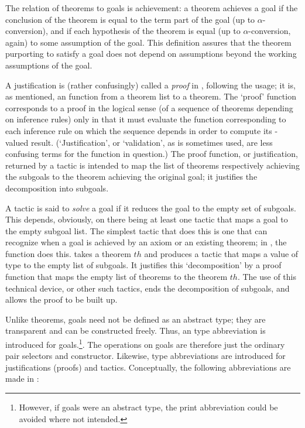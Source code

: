 The relation of theorems to goals is achievement:
a theorem achieves a goal if the conclusion of the theorem
is equal to the term part of the goal (up to $\alpha$-conversion), and
if each hypothesis of the theorem is equal (up to $\alpha$-conversion,
again) to some assumption of the goal. This definition assures that
the theorem purporting to satisfy a goal does not depend on
assumptions beyond the working assumptions of the goal.

A justification is (rather confusingly) called
a {\it proof\/}
in \HOL{}, following the \LCF{} usage; it is, as mentioned,
an \ML{} function
from a theorem list to a theorem.  The \ML{} `proof' function
corresponds to a proof
 in the
logical sense (of a sequence of theorems depending on inference rules)
only in that it must
evaluate the \ML{} function corresponding
to each inference rule on which the sequence depends
in order to compute its -valued result. (`Justification', or
`validation',
 as is sometimes used, are less confusing terms for
the \ML{} function in question.)
The proof function, or justification, returned by a tactic is intended to map the
list of theorems respectively achieving the subgoals to the
theorem achieving the original goal; it justifies the decomposition
into subgoals.

A tactic is said to {\it solve\/}
 a goal if it reduces the goal to the
empty set of subgoals.
This depends, obviously, on there being at least one
tactic that maps a goal to the empty subgoal list.  The simplest
tactic that does this is one that can recognize when a goal is
achieved by an axiom or an existing theorem; in \HOL, the function
 does this.  takes a theorem $th$
and produces a tactic that maps a value
of type  to the empty list of subgoals. It justifies this
`decomposition' by a proof function that maps the empty list of theorems
to the theorem $th$. The use of this technical device, or other
such tactics, ends the decomposition of subgoals, and allows the proof
to be built up.

Unlike theorems, goals need not be defined as an abstract type; they
are transparent and can be constructed freely. Thus, an \ML{} type
abbreviation is introduced for goals.\footnote{However, if goals were
  an abstract type, the print abbreviation could be avoided where not
  intended.}.  The operations on goals are therefore just the ordinary
pair selectors and constructor.
Likewise, type abbreviations are introduced for justifications
(proofs) and tactics. Conceptually, the following abbreviations are
made in \HOL:

